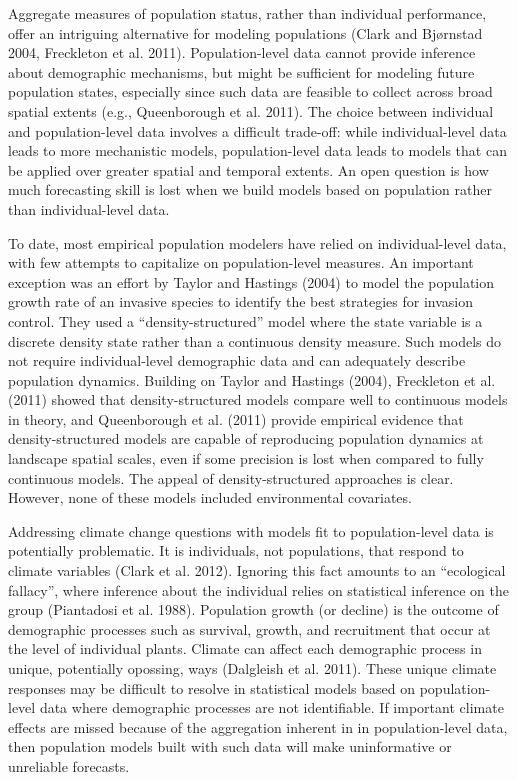 \documentclass[12pt,]{article}
\begin{document}
Aggregate measures of population status, rather than individual
performance, offer an intriguing alternative for modeling populations
(Clark and Bjørnstad 2004, Freckleton et al. 2011). Population-level
data cannot provide inference about demographic mechanisms, but might be
sufficient for modeling future population states, especially since such
data are feasible to collect across broad spatial extents (e.g.,
Queenborough et al. 2011). The choice between individual and
population-level data involves a difficult trade-off: while
individual-level data leads to more mechanistic models, population-level
data leads to models that can be applied over greater spatial and
temporal extents. An open question is how much forecasting skill is lost
when we build models based on population rather than individual-level
data.

To date, most empirical population modelers have relied on
individual-level data, with few attempts to capitalize on
population-level measures. An important exception was an effort by
Taylor and Hastings (2004) to model the population growth rate of an
invasive species to identify the best strategies for invasion control.
They used a ``density-structured'' model where the state variable is a
discrete density state rather than a continuous density measure. Such
models do not require individual-level demographic data and can
adequately describe population dynamics. Building on Taylor and Hastings
(2004), Freckleton et al. (2011) showed that density-structured models
compare well to continuous models in theory, and Queenborough et al.
(2011) provide empirical evidence that density-structured models are
capable of reproducing population dynamics at landscape spatial scales,
even if some precision is lost when compared to fully continuous models.
The appeal of density-structured approaches is clear. However, none of
these models included environmental covariates.

Addressing climate change questions with models fit to population-level
data is potentially problematic. It is individuals, not populations,
that respond to climate variables (Clark et al. 2012). Ignoring this
fact amounts to an ``ecological fallacy'', where inference about the
individual relies on statistical inference on the group (Piantadosi et
al. 1988). Population growth (or decline) is the outcome of demographic
processes such as survival, growth, and recruitment that occur at the
level of individual plants. Climate can affect each demographic process
in unique, potentially opossing, ways (Dalgleish et al. 2011). These
unique climate responses may be difficult to resolve in statistical
models based on population-level data where demographic processes are
not identifiable. If important climate effects are missed because of the
aggregation inherent in in population-level data, then population models
built with such data will make uninformative or unreliable forecasts.
\end{document}
